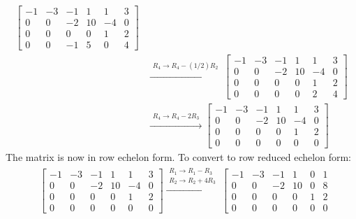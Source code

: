 \documentclass{article}
\begin{document}
\begin{itemize}
\begin{align*}
\left[\begin{array}{ccccc|c}
-1 & -3 & -1 &  1 &  1 &  3 \\
 0 &  0 & -2 & 10 & -4 &  0 \\
 0 &  0 &  0 &  0 &   1 &  2 \\
 0 &  0 & -1 &  5 &  0 &  4
\end{array}\right] \\ 
& \xrightarrow{\begin{array}{c} R_4 \rightarrow R_4 - (1/2)R_2 \end{array}}
\left[\begin{array}{ccccc|c}
-1 & -3 & -1 &  1 &  1 &  3 \\
 0 &  0 & -2 & 10 & -4 &  0 \\
 0 &  0 &  0 &  0 &   1 &  2 \\
 0 &  0 &  0 &  0 &  2 &  4
\end{array}\right] \\ 
& \xrightarrow{\begin{array}{c} R_4 \rightarrow R_4 - 2R_3 \end{array}}
\left[\begin{array}{ccccc|c}
-1 & -3 & -1 &  1 &  1 &  3 \\
 0 &  0 & -2 & 10 & -4 &  0 \\
 0 &  0 &  0 &  0 &   1 &  2 \\
 0 &  0 &  0 &  0 &   0 &  0
\end{array}\right] 
\end{align*}
The matrix is now in row echelon form. To convert to row reduced echelon form: 
\begin{align*}
& \left[\begin{array}{ccccc|c}
-1 & -3 & -1 &  1 &  1 &  3 \\
 0 &  0 & -2 & 10 & -4 &  0 \\
 0 &  0 &  0 &  0 &   1 &  2 \\
 0 &  0 &  0 &  0 &   0 &  0
\end{array}\right] 
\xrightarrow{\begin{array}{c} R_1 \rightarrow R_1 - R_3 \\ R_2 \rightarrow R_2 + 4R_3 \end{array}}
\left[\begin{array}{ccccc|c}
-1 & -3 & -1 &  1 &  0 &  1 \\
 0 &  0 & -2 & 10 &  0 &  8 \\
 0 &  0 &  0 &  0 &   1 &  2 \\
 0 &  0 &  0 &  0 &   0 &  0

\end{array}
\end{align*}
\end{itemize}
\end{document}
